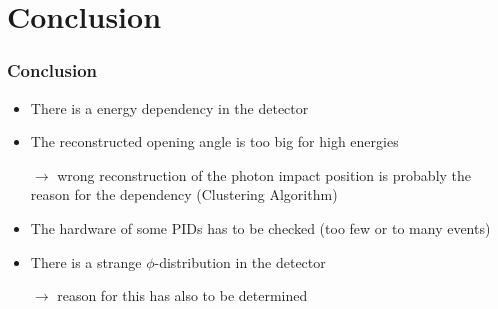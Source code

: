 \documentclass[slidestop,compress,mathserif]{beamer}
\begin{document}
\section{Conclusion}
\begin{frame}
	\frametitle{Conclusion}
	\begin{itemize}
		\item There is a energy dependency in the detector
		\item The reconstructed opening angle is too big for high energies
		
		$\rightarrow$ wrong reconstruction of the photon impact position is probably the reason for the dependency (Clustering Algorithm) 
		\item The hardware of some PIDs has to be checked (too few or to many events)
		\item There is a strange $\phi$-distribution in the detector
		
		$\rightarrow$ reason for this has also to be determined
	\end{itemize}
\end{frame}
\end{document}
